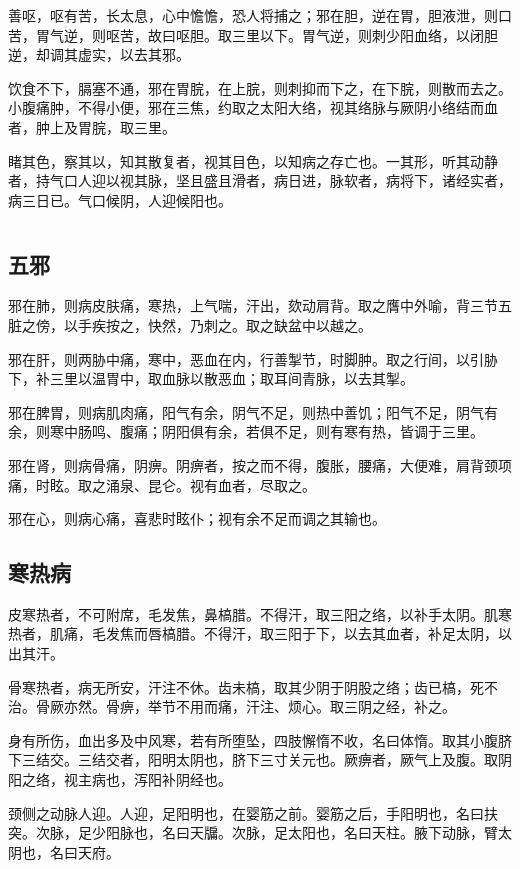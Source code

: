 \documentclass[a4paper,12pt,UTF8,twoside]{ctexbook}
\begin{document}
	善呕，呕有苦，长太息，心中憺憺，恐人将捕之；邪在胆，逆在胃，胆液泄，则口苦，胃气逆，则呕苦，故曰呕胆。取三里以下。胃气逆，则刺少阳血络，以闭胆逆，却调其虚实，以去其邪。
	
	饮食不下，膈塞不通，邪在胃脘，在上脘，则刺抑而下之，在下脘，则散而去之。小腹痛肿，不得小便，邪在三焦，约取之太阳大络，视其络脉与厥阴小络结而血者，肿上及胃脘，取三里。
	
	睹其色，察其以，知其散复者，视其目色，以知病之存亡也。一其形，听其动静者，持气口人迎以视其脉，坚且盛且滑者，病日进，脉软者，病将下，诸经实者，病三日已。气口候阴，人迎候阳也。
	
	\part{}
	\chapter{五邪}
	
	邪在肺，则病皮肤痛，寒热，上气喘，汗出，欬动肩背。取之膺中外喻，背三节五脏之傍，以手疾按之，快然，乃刺之。取之缺盆中以越之。
	
	邪在肝，则两胁中痛，寒中，恶血在内，行善掣节，时脚肿。取之行间，以引胁下，补三里以温胃中，取血脉以散恶血；取耳间青脉，以去其掣。
	
	邪在脾胃，则病肌肉痛，阳气有余，阴气不足，则热中善饥；阳气不足，阴气有余，则寒中肠鸣、腹痛；阴阳俱有余，若俱不足，则有寒有热，皆调于三里。
	
	邪在肾，则病骨痛，阴痹。阴痹者，按之而不得，腹胀，腰痛，大便难，肩背颈项痛，时眩。取之涌泉、昆仑。视有血者，尽取之。
	
	邪在心，则病心痛，喜悲时眩仆；视有余不足而调之其输也。
	\chapter{寒热病}
	
	皮寒热者，不可附席，毛发焦，鼻槁腊。不得汗，取三阳之络，以补手太阴。肌寒热者，肌痛，毛发焦而唇槁腊。不得汗，取三阳于下，以去其血者，补足太阴，以出其汗。
	
	骨寒热者，病无所安，汗注不休。齿未槁，取其少阴于阴股之络；齿已槁，死不治。骨厥亦然。骨痹，举节不用而痛，汗注、烦心。取三阴之经，补之。
	
	身有所伤，血出多及中风寒，若有所堕坠，四肢懈惰不收，名曰体惰。取其小腹脐下三结交。三结交者，阳明太阴也，脐下三寸关元也。厥痹者，厥气上及腹。取阴阳之络，视主病也，泻阳补阴经也。
	
	颈侧之动脉人迎。人迎，足阳明也，在婴筋之前。婴筋之后，手阳明也，名曰扶突。次脉，足少阳脉也，名曰天牖。次脉，足太阳也，名曰天柱。腋下动脉，臂太阴也，名曰天府。
	
\end{document}
